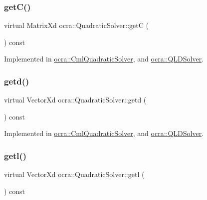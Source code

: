 \subsubsection{\texorpdfstring{get\+C()}{getC()}}
{\footnotesize\ttfamily virtual Matrix\+Xd ocra\+::\+Quadratic\+Solver\+::getC (\begin{DoxyParamCaption}{ }\end{DoxyParamCaption}) const\hspace{0.3cm}{\ttfamily [pure virtual]}}



Implemented in \hyperlink{classocra_1_1CmlQuadraticSolver_a94c170188e1f3d00aaee5628e2501a64}{ocra\+::\+Cml\+Quadratic\+Solver}, and \hyperlink{classocra_1_1QLDSolver_a92a18dc5df3511bcc9fc9ff5f45f621b}{ocra\+::\+Q\+L\+D\+Solver}.

\hypertarget{classocra_1_1QuadraticSolver_a7f15d5d3c28feac3204542c885d68586}{}\label{classocra_1_1QuadraticSolver_a7f15d5d3c28feac3204542c885d68586} 
\subsubsection{\texorpdfstring{getd()}{getd()}}
{\footnotesize\ttfamily virtual Vector\+Xd ocra\+::\+Quadratic\+Solver\+::getd (\begin{DoxyParamCaption}{ }\end{DoxyParamCaption}) const\hspace{0.3cm}{\ttfamily [pure virtual]}}



Implemented in \hyperlink{classocra_1_1CmlQuadraticSolver_a0d3fd75da9a338208f7a5f5e1417346b}{ocra\+::\+Cml\+Quadratic\+Solver}, and \hyperlink{classocra_1_1QLDSolver_ad3434ad289da51ffe440b7959972ca89}{ocra\+::\+Q\+L\+D\+Solver}.

\hypertarget{classocra_1_1QuadraticSolver_a13e3a471615ca667daadf490dedc18eb}{}\label{classocra_1_1QuadraticSolver_a13e3a471615ca667daadf490dedc18eb} 
\subsubsection{\texorpdfstring{getl()}{getl()}}
{\footnotesize\ttfamily virtual Vector\+Xd ocra\+::\+Quadratic\+Solver\+::getl (\begin{DoxyParamCaption}{ }\end{DoxyParamCaption}) const\hspace{0.3cm}{\ttfamily [pure virtual]}}



